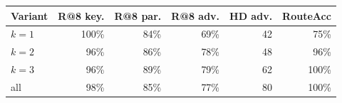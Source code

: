 \begin{tabular}{l rrr r r}
\toprule
Variant & R@8 key. & R@8 par. & R@8 adv. & HD adv. & RouteAcc \\
\midrule
$k{=}1$ & 100\% & 84\% & 69\% & 42 & 75\% \\
$k{=}2$ & 96\% & 86\% & 78\% & 48 & 96\% \\
$k{=}3$ & 96\% & 89\% & 79\% & 62 & 100\% \\
all & 98\% & 85\% & 77\% & 80 & 100\% \\
\bottomrule
\end{tabular}
